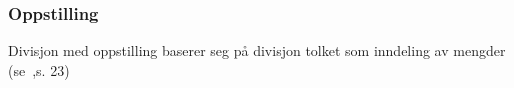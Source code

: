\subsubsection{Oppstilling}
Divisjon med oppstilling baserer seg på divisjon tolket som inndeling av mengder (se \mb\,,s. 23)

\begin{center}
	\parbox{0.3\linewidth}{
}\qquad
\parbox{0.45\linewidth}{
}
\end{center}

